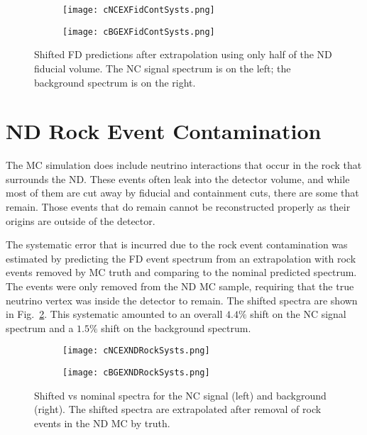 \begin{doublespace}
\begin{figure}[h]
  \centering
  \begin{subfigure}{.48\textwidth}
    \centering
    \texttt{[image: cNCEXFidContSysts.png]}
  \end{subfigure}
  \begin{subfigure}{.48\textwidth}
    \centering
    \texttt{[image: cBGEXFidContSysts.png]}
  \end{subfigure}
  \caption[Shifted FD Predictions from Extrapolation of Halves of the ND]{Shifted FD predictions after extrapolation using only half of the ND fiducial volume. The NC signal spectrum is on the left; the background spectrum is on the right.}
  \label{fig:SystFidCont}
\end{figure}

\section{ND Rock Event Contamination}

The MC simulation does include neutrino interactions that occur in the rock that surrounds the ND. These events often leak into the detector volume, and while most of them are cut away by fiducial and containment cuts, there are some that remain. Those events that do remain cannot be reconstructed properly as their origins are outside of the detector. 

The systematic error that is incurred due to the rock event contamination was estimated by predicting the FD event spectrum from an extrapolation with rock events removed by MC truth and comparing to the nominal predicted spectrum. The events were only removed from the ND MC sample, requiring that the true neutrino vertex was inside the detector to remain. The shifted spectra are shown in Fig.~\ref{fig:SystNDRock}. This systematic amounted to an overall $4.4\%$ shift on the NC signal spectrum and a $1.5\%$ shift on the background spectrum.

\begin{figure}[h]
  \centering
  \begin{subfigure}{.48\textwidth}
    \centering
    \texttt{[image: cNCEXNDRockSysts.png]}
  \end{subfigure}
  \begin{subfigure}{.48\textwidth}
    \centering
    \texttt{[image: cBGEXNDRockSysts.png]}
  \end{subfigure}
  \caption[ND Rock Contamination Shifted Spectra]{Shifted vs nominal spectra for the NC signal (left) and background (right). The shifted spectra are extrapolated after removal of rock events in the ND MC by truth.}
  \label{fig:SystNDRock}
\end{figure}


\end{doublespace}
